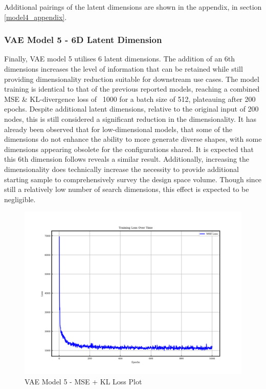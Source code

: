 \documentclass{article}
\begin{document}
Additional pairings of the latent dimensions are shown in the appendix, in section \ref{model4_appendix}.


\subsubsection{VAE Model 5 - 6D Latent Dimension}

Finally, VAE model 5 utilises 6 latent dimensions. The addition of an 6th dimensions increases the level of information that can be retained while still providing dimensionality reduction suitable for downstream use cases. The model training is identical to that of the previous reported models, reaching a combined MSE \& KL-divergence loss of ~1000 for a batch size of 512, plateauing after 200 epochs. Despite additional latent dimensions, relative to the original input of 200 nodes, this is still considered a significant reduction in the dimensionality. It has already been observed that for low-dimensional models, that some of the dimensions do not enhance the ability to more generate diverse shapes, with some dimensions appearing obsolete for the configurations shared. It is expected that this 6th dimension follows reveals a similar result. Additionally, increasing the dimensionality does technically increase the necessity to provide additional starting sample to comprehensively survey the design space volume. Though since still a relatively low number of search dimensions, this effect is expected to be negligible.

\begin{figure}[H]
\centering
    \includegraphics[width=0.75\linewidth]{figures/VAEmodels/model5/loss_plot.png}
    \caption{VAE Model 5 - MSE + KL Loss Plot}
    \label{fig:model5_loss_plot}
\end{figure}
\end{document}
